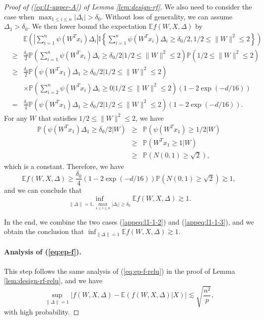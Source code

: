 \begin{proof}[Proof of (\ref{eq:l1-upper-A}) of Lemma \ref{lem:design-rf}]
We also need to consider the case when $\max_{1\leq i\leq n}|\Delta_i|> \delta_0$. Without loss of generality, we can assume $\Delta_1>\delta_0$.
We then lower bound the expectation $\mathbb{E}f(W,X,\Delta)$ by
\begin{eqnarray*}
&& \mathbb{E}\left(\left|\sum_{i=1}^n\psi(W^Tx_i)\Delta_i\right|\mathbb{I}\left\{\sum_{i=1}^n\psi(W^Tx_i)\Delta_i \geq \delta_0/2, 1/2\leq \|W\|^2\leq 2\right\}\right) \\
&\geq& \frac{\delta_0}{2} \mathbb{P}\left(\sum_{i=1}^n\psi(W^Tx_i)\Delta_i \geq \delta_0/2\Big| 1/2\leq \|W\|^2\leq 2\right)\mathbb{P}\left(1/2\leq \|W\|^2\leq 2\right) \\
&\geq& \frac{\delta_0}{2} \mathbb{P}\left(\psi(W^Tx_1)\Delta_1 \geq \delta_0/2\Big|1/2\leq \|W\|^2\leq 2\right) \\
&& \times \mathbb{P}\left(\sum_{i=2}^n\psi(W^Tx_i)\Delta_i \geq 0\Big|1/2\leq \|W\|^2\leq 2\right)\left(1-2\exp(-d/16)\right) \\
&=& \frac{\delta_0}{4} \mathbb{P}\left(\psi(W^Tx_1)\Delta_1 \geq \delta_0/2\Big|1/2\leq \|W\|^2\leq 2\right)\left(1-2\exp(-d/16)\right).
\end{eqnarray*}
For any $W$ that satisfies $1/2\leq \|W\|^2\leq 2$, we have
\begin{eqnarray*}
\mathbb{P}\left(\psi(W^Tx_1)\Delta_1 \geq \delta_0/2\Big|W\right) &\geq& \mathbb{P}\left(\psi(W^Tx_1)\geq 1/2\Big|W\right) \\
&\geq&  \mathbb{P}\left(W^Tx_1\geq 1\Big|W\right) \\
&\geq& \mathbb{P}\left(N(0,1)\geq \sqrt{2}\right),
\end{eqnarray*}
which is a constant.
Therefore, we have
$$\mathbb{E}f(W,X,\Delta)\geq \frac{\delta_0}{4}\left(1-2\exp(-d/16)\right)\mathbb{P}\left(N(0,1)\geq \sqrt{2}\right)\gtrsim 1,$$
and we can conclude that
\begin{equation}
\inf_{\|\Delta\|=1, \max_{1\leq i\leq n}|\Delta_i|\geq\delta_0}\mathbb{E}f(W,X,\Delta) \gtrsim 1.\label{appeq:l1-1-3}
\end{equation}

In the end, we combine the two cases (\ref{appeq:l1-1-2}) and (\ref{appeq:l1-1-3}),  and we obtain the conclusion that $\inf_{\|\Delta\|=1}\mathbb{E}f(W,X,\Delta)\gtrsim 1$.


\paragraph{Analysis of (\ref{eq:ep-f}).} This step follows the same analysis of (\ref{eq:ep-f-relu}) in the proof of Lemma \ref{lem:design-rf-relu}, and we have
$$\sup_{\|\Delta\|=1}\left|f(W,X,\Delta)-\mathbb{E}(f(W,X,\Delta)|X)\right|\lesssim \sqrt{\frac{n^2}{p}},$$
with high probability.


\end{proof}
